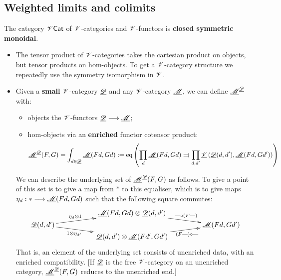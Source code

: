 \documentclass[11pt]{article}
\begin{document}
\subsection*{Weighted limits and colimits}
\begin{itemise}
\setlength{\parindent}{.25in}
\item The category $\mathscr{V}\mathsf{Cat}$ of $\mathscr{V}$-categories and $\mathscr{V}$-functors is \textbf{closed symmetric monoidal}.
\begin{itemize}\squishlist
\setlength{\parindent}{.25in}
\item The tensor product of $\mathscr{V}$-categories takes the cartesian product on objects, but tensor products on hom-objects. To get a $\mathscr{V}$-category structure we repeatedly use the symmetry isomorphism in $\mathscr{V}$.
\item Given a \textbf{small} $\mathscr{V}$-category $\underline{\mathscr{D}}$ and any $\mathscr{V}$-category $\underline{\mathscr{M}}$, we can define $\underline{\mathscr{M}}^{\underline{\mathscr{D}}}$ with:
\begin{itemize}\squishlist
\setlength{\parindent}{.25in}
\item objects the $\mathscr{V}$-functors $\underline{\mathscr{D}}\longrightarrow\underline{\mathscr{M}}$;
\item hom-objects via an \textbf{enriched} functor cotensor product:
\[\underline{\mathscr{M}}^{\underline{\mathscr{D}}}(F,G)=\int_{d\in\underline{\mathscr{D}}} \underline{\mathscr{M}}(Fd,Gd):=\textup{eq}\left(
\prod_{d}\underline{\mathscr{M}}(Fd,Gd)\rightrightarrows \prod_{d,d'}\underline{\mathscr{V}} \left(\underline{\mathscr{D}}(d,d'),\underline{\mathscr{M}}(Fd,Gd')\right)
\right)\]
\end{itemize}
We can describe the underlying set of ${\underline{\mathscr{M}}^{\underline{\mathscr{D}}}(F,G)}$ as follows. To give a point of this set is to give a map from $*$ to this equaliser, which is to give maps $\eta_d:*\longrightarrow\underline{\mathscr{M}}(Fd,Gd)$ such that the following square commutes:
\[\vcenter{\xymatrix@R=6mm@C=45mm@!0{
&%
\underline{\scrm}(Fd,Gd)\otimes \underline{\scrd}(d,d')\ar[dr]^-{\DASH \circ (F\DASH)}
&%
\\%
\underline{\scrd}(d,d')
\ar[ur]^-{\eta_d\otimes 1}
\ar[dr]_-{1\otimes \eta_{d'}}
&%
&%
\underline{\scrm}(Fd,Gd')\\%
&%
\underline{\scrd}(d,d')\otimes \underline{\scrm}(Fd',Gd') \ar[uudr]_-{(F\DASH) \circ \DASH }&%
}}\]
That is, an element of the underlying set consists of unenriched data, with an enriched compatibility.  [If $\underline{\mathscr{D}}$ is the free $\mathscr{V}$-category on an unenriched category, $\underline{\mathscr{M}}^{\underline{\mathscr{D}}}(F,G)$ reduces to the unenriched end.]


\end{itemize}
\end{itemise}
\end{document}
